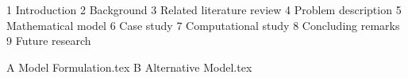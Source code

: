 \documentclass{report}
\begin{document}
\newpage

\tableofcontents
\newpage
\listoffigures
\newpage
\listoftables

\mainmatter

{1 Introduction}
\newpage
{2 Background}
\newpage
{3 Related literature review}
\newpage
{4 Problem description}
\newpage
{5 Mathematical model}
\newpage
{6 Case study}
\newpage
{7 Computational study}
\newpage
{8 Concluding remarks}
\newpage
{9 Future research}
\newpage


\addappendix
{A Model Formulation.tex}
{B Alternative Model.tex}

\addbib

\end{document}
